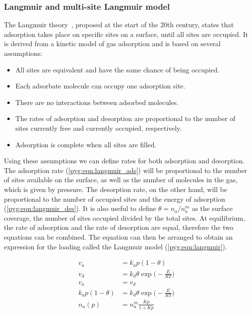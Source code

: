 \subsubsection{Langmuir and multi-site Langmuir
	model}\label{pyg:models:langmuir}

The Langmuir theory~\cite{langmuirAdsorptionGasesPlane1918a},
proposed at the start of the 20th century, states that
adsorption takes place on specific sites on a surface, until
all sites are occupied.
It is derived from a kinetic model of gas adsorption and
is based on several assumptions:

\begin{itemize}

	\item All sites are equivalent and have the same chance of
	      being occupied.
	\item Each adsorbate molecule can occupy one adsorption site.
	\item There are no interactions between adsorbed molecules.
	\item The rates of adsorption and desorption are proportional
	      to the number
	      of sites currently free and currently occupied,
	      respectively.
	\item Adsorption is complete when all sites are filled.

\end{itemize}

Using these assumptions we can define rates for both adsorption and
desorption. The adsorption rate (\autoref{pyg:eqn:langmuir_ads})
will be proportional to the number of sites available on the surface,
as well as the number of molecules in the gas, which is given by
pressure.
The desorption rate, on the other hand, will be proportional to the
number of occupied sites and the energy of adsorption
(\autoref{pyg:eqn:langmuir_des}).
It is also useful to define \(\theta = n_a/n_a^m\) as the surface
coverage,
the number of sites occupied divided by the total sites. At
equilibrium,
the rate of adsorption and the rate of
desorption are equal, therefore the two equations can be combined.
The equation can then be arranged to obtain an expression for the
loading called the Langmuir model (\autoref{pyg:eqn:langmuir}).

\begin{align}
	v_a                & = k_a p (1 - \theta) \label{pyg:eqn:langmuir_ads} \\
	v_d                & = k_d \theta \exp{\Big(-\frac{E}{RT}\Big)}
	\label{pyg:eqn:langmuir_des}                                           \\
	v_a                & = v_d                                             \\
	k_a p (1 - \theta) & = k_d \theta \exp{\Big(-\frac{E}{RT}\Big)}        \\
	n_a(p)             & = n_a^m \frac{Kp}{1+Kp} \label{pyg:eqn:langmuir}
\end{align}

